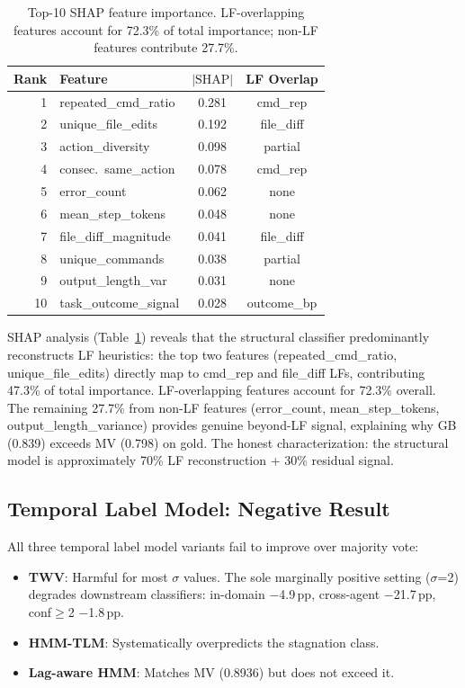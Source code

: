 \documentclass[11pt,a4paper]{article}
\begin{document}
\begin{table}[t]
\centering
\small
\begin{tabular}{rlcc}
\toprule
\textbf{Rank} & \textbf{Feature} & \textbf{$|\text{SHAP}|$} & \textbf{LF Overlap} \\
\midrule
1 & repeated\_cmd\_ratio & 0.281 & cmd\_rep \\
2 & unique\_file\_edits & 0.192 & file\_diff \\
3 & action\_diversity & 0.098 & partial \\
4 & consec.\ same\_action & 0.078 & cmd\_rep \\
5 & error\_count & 0.062 & none \\
6 & mean\_step\_tokens & 0.048 & none \\
7 & file\_diff\_magnitude & 0.041 & file\_diff \\
8 & unique\_commands & 0.038 & partial \\
9 & output\_length\_var & 0.031 & none \\
10 & task\_outcome\_signal & 0.028 & outcome\_bp \\
\bottomrule
\end{tabular}
\caption{Top-10 SHAP feature importance. LF-overlapping features account for 72.3\% of total importance; non-LF features contribute 27.7\%.}
\label{tab:shap}
\end{table}

SHAP analysis (Table~\ref{tab:shap}) reveals that the structural classifier predominantly reconstructs LF heuristics: the top two features (repeated\_cmd\_ratio, unique\_file\_edits) directly map to cmd\_rep and file\_diff LFs, contributing 47.3\% of total importance.
LF-overlapping features account for 72.3\% overall.
The remaining 27.7\% from non-LF features (error\_count, mean\_step\_tokens, output\_length\_variance) provides genuine beyond-LF signal, explaining why GB (0.839) exceeds MV (0.798) on gold.
The honest characterization: the structural model is approximately 70\% LF reconstruction + 30\% residual signal.

\subsection{Temporal Label Model: Negative Result}

All three temporal label model variants fail to improve over majority vote:

\begin{itemize}
    \item \textbf{TWV}: Harmful for most $\sigma$ values. The sole marginally positive setting ($\sigma$=2) degrades downstream classifiers: in-domain $-$4.9\,pp, cross-agent $-$21.7\,pp, conf$\geq$2 $-$1.8\,pp.
    \item \textbf{HMM-TLM}: Systematically overpredicts the stagnation class.
    \item \textbf{Lag-aware HMM}: Matches MV (0.8936) but does not exceed it.
\end{itemize}
\end{document}

